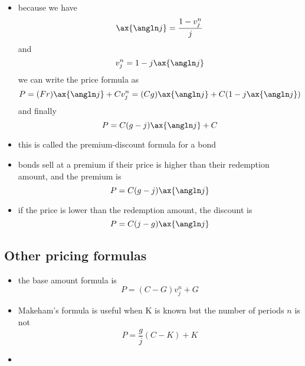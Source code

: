 \documentclass[../00_main.tex]{subfiles}
\begin{document}
\begin{itemize}
    \item because we have 
        \begin{equation}\nonumber
            \ax{\angln j} = \frac{1 - v_j^n}{j}
        \end{equation}
        and
        \begin{equation}\nonumber
            v_j^n = 1 - j \ax{\angln j}
        \end{equation}
        we can write the price formula as 
        \begin{equation}\nonumber
            P = (Fr) \ax{\angln j} + Cv_j^n = (Cg) \ax{\angln j} 
                + C (1 - j \ax{\angln j})
        \end{equation}
        and finally 
        \begin{equation}\nonumber
            P = C(g - j) \ax{\angln j} + C
        \end{equation}
    \item this is called the premium-discount formula for a bond
    \item bonds sell at a premium if their price is higher than their
        redemption amount, and the premium is 
        \begin{equation}\nonumber
            P = C(g - j) \ax{\angln j}
        \end{equation}
    \item if the price is lower than the redemption amount, the discount is
        \begin{equation}\nonumber
            P = C(j - g) \ax{\angln j}
        \end{equation}
\end{itemize}

\subsection{Other pricing formulas}

\begin{itemize}
    \item the base amount formula is 
        \begin{equation}\nonumber
            P = (C - G) v_j^n + G 
        \end{equation}
    \item Makeham's formula is useful when K is known but the number of
        periods $n$ is not
        \begin{equation}\nonumber
            P = \frac{g}{j} (C - K) + K
        \end{equation}
    \item 
\end{itemize}
\end{document}
